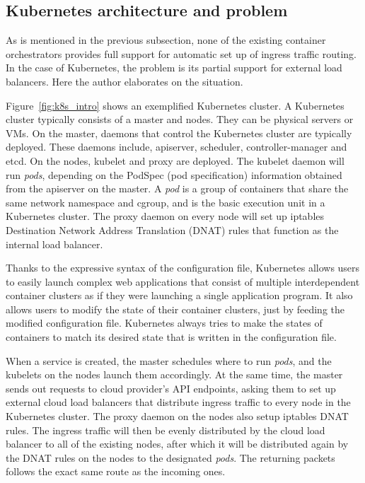 \subsection{Kubernetes architecture and problem}

As is mentioned in the previous subsection, none of the existing container orchestrators provides full support for automatic set up of ingress traffic routing.
In the case of Kubernetes, the problem is its partial support for external load balancers.
Here the author elaborates on the situation.

Figure~\ref{fig:k8s_intro} shows an exemplified Kubernetes cluster.
A Kubernetes cluster typically consists of a master and nodes. They can be physical servers or VMs.
On the master, daemons that control the Kubernetes cluster are typically deployed. 
These daemons include, apiserver, scheduler, controller-manager and etcd. 
On the nodes, kubelet and proxy are deployed.
The kubelet daemon will run {\it pods}, depending on the PodSpec (pod specification) information obtained from the apiserver on the master.
A {\em pod} is a group of containers that share the same network namespace and cgroup, and is the basic execution unit in a Kubernetes cluster.
The proxy daemon on every node will set up iptables Destination Network Address Translation (DNAT) rules that function as the internal load balancer.


Thanks to the expressive syntax of the configuration file, Kubernetes allows users to easily launch complex web applications that consist of multiple interdependent container clusters as if they were launching a single application program.
It also allows users to modify the state of their container clusters, just by feeding the modified configuration file.
Kubernetes always tries to make the states of containers to match its desired state that is written in the configuration file.

When a service is created, the master schedules where to run {\em pods}, and the kubelets on the nodes launch them accordingly.
At the same time, the master sends out requests to cloud provider's API endpoints, asking them to set up external cloud load balancers that distribute ingress traffic to every node in the Kubernetes cluster.
The proxy daemon on the nodes also setup iptables DNAT rules. 
The ingress traffic will then be evenly distributed by the cloud load balancer to all of the existing nodes, 
after which it will be distributed again by the DNAT rules on the nodes to the designated {\em pods}. 
The returning packets follows the exact same route as the incoming ones.

